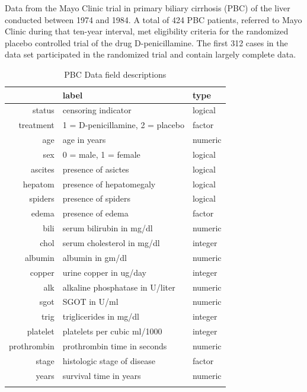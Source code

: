 \documentclass[nojss]{jss}\usepackage[]{graphicx}\usepackage[]{color}
\begin{document}
Data from the Mayo Clinic trial in primary biliary cirrhosis (PBC) of the liver conducted between 1974 and 1984. A total of 424 PBC patients, referred to Mayo Clinic during that ten-year interval, met eligibility criteria for the randomized placebo controlled trial of the drug D-penicillamine. The first 312 cases in the data set participated in the randomized trial and contain largely complete data.



\begin{table}[ht]
\centering
{\footnotesize
\begin{tabular}{rll}
  \toprule
 & label & type \\ 
  \midrule
status & censoring indicator & logical \\ 
   \rowcolor[gray]{0.95}treatment & 1 = D-penicillamine, 2 = placebo & factor \\ 
  age & age in years & numeric \\ 
   \rowcolor[gray]{0.95}sex & 0 = male, 1 = female & logical \\ 
  ascites & presence of asictes & logical \\ 
   \rowcolor[gray]{0.95}hepatom & presence of hepatomegaly & logical \\ 
  spiders & presence of spiders & logical \\ 
   \rowcolor[gray]{0.95}edema & presence of edema & factor \\ 
  bili & serum bilirubin in mg/dl & numeric \\ 
   \rowcolor[gray]{0.95}chol & serum cholesterol in mg/dl & integer \\ 
  albumin & albumin in gm/dl & numeric \\ 
   \rowcolor[gray]{0.95}copper & urine copper in ug/day & integer \\ 
  alk & alkaline phosphatase in U/liter & numeric \\ 
   \rowcolor[gray]{0.95}sgot & SGOT in U/ml & numeric \\ 
  trig & triglicerides in mg/dl & integer \\ 
   \rowcolor[gray]{0.95}platelet & platelets per cubic ml/1000 & integer \\ 
  prothrombin & prothrombin time in seconds & numeric \\ 
   \rowcolor[gray]{0.95}stage & histologic stage of disease & factor \\ 
  years & survival time in years & numeric \\ 
   \rowcolor[gray]{0.95} \bottomrule
\end{tabular}
}
\caption{PBC Data field descriptions} 
\label{T:dataLabs}
\end{table}
\end{document}
